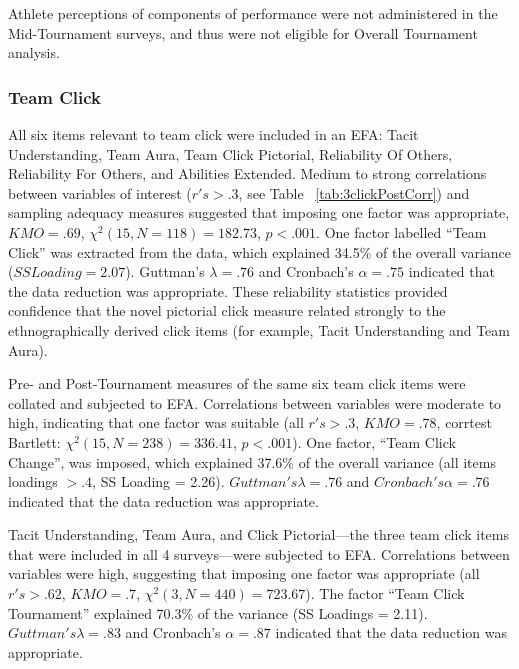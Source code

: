 \begin{CJK}{UTF8}{gbsn}
Athlete perceptions of components of performance were not administered in the Mid-Tournament surveys, and thus were not eligible for Overall Tournament analysis.









\subsubsection{Team Click}

All six items relevant to team click were included in an EFA: Tacit Understanding, Team Aura, Team Click Pictorial, Reliability Of Others, Reliability For Others, and Abilities Extended.  Medium to strong correlations between variables of interest ($r's > .3$, see Table ~\ref{tab:3clickPostCorr}) and sampling adequacy measures suggested that imposing one factor was appropriate, $KMO =  .69$, $\chi^2(15, N = 118) = 182.73$, $p < .001$.  One factor labelled ``Team Click'' was extracted from the data, which explained 34.5\% of the overall variance ($SS Loading = 2.07$).  Guttman's $\lambda =.76$ and Cronbach's $\alpha = .75$ indicated that the data reduction was appropriate.  These reliability statistics provided confidence that the novel pictorial click measure related strongly to the ethnographically derived click items (for example, Tacit Understanding and Team Aura).


Pre- and Post-Tournament measures of the same six team click items were collated and subjected to EFA. Correlations between variables were moderate to high, indicating that one factor was suitable (all $r's > .3$, $KMO = .78$, corrtest Bartlett: $\chi^2(15, N = 238) = 336.41$, $p < .001$).  One factor, ``Team Click Change'', was imposed, which explained 37.6\% of the overall variance (all items loadings $> .4$, SS Loading = 2.26).  $Guttman's \lambda =.76$ and $Cronbach's \alpha = .76$ indicated that the data reduction was appropriate.

Tacit Understanding, Team Aura, and Click Pictorial---the three team click items that were included in all 4 surveys---were subjected to EFA.  Correlations between variables were high, suggesting that imposing one factor was appropriate (all $r's > .62$, $KMO = .7$, $\chi^2(3, N = 440) = 723.67$).  The factor ``Team Click Tournament'' explained 70.3\% of the variance (SS Loadings = 2.11).  $Guttman's \lambda =.83$ and Cronbach's $\alpha = .87$ indicated that the data reduction was appropriate.


\end{CJK}
